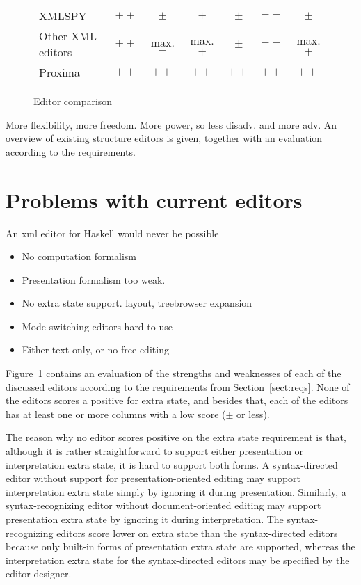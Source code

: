 \documentclass{speauth}
\begin{document}
\begin{figure}
\begin{center}
\begin{scriptsize}
\begin{tabular}[t]{l|c|c|c|c|c|c}
XMLSPY				&   $++$	&   $\pm$	&   $+$ 	&  $\pm$	&   $--$	&   $\pm$	\\
Other XML editors		&   $++$   & max. $-$ & max. $\pm$&  $\pm$&   $--$	&   max. $\pm$	\\
\hline
Proxima				&   $++$	&   $++$	&   $++$ 	&   $++$	&   $++$	&     $++$	\\
\end{tabular}                                                   
\end{scriptsize}
\caption{Editor comparison}\label{scoretable} 
\end{center}
\end{figure}



 
\bc
More flexibility, more freedom. More power, so less disadv. and more adv. An overview of existing structure editors is given, together with an evaluation according to the requirements. 

\section{Problems with current editors}
An xml editor for Haskell would never be possible
\begin{itemize}
\item No computation formalism
\item Presentation formalism too weak. 
\item No extra state support. layout, treebrowser expansion
\item Mode switching editors hard to use
\item Either text only, or no free editing
\end{itemize}
\ec

Figure~\ref{scoretable} contains an evaluation of the strengths and weaknesses of each of the discussed editors according to the requirements from Section~\ref{sect:reqs}. None of the editors scores a positive for extra state, and besides that, each of the editors has at least one or more columns with a low score ($\pm$ or less). 

The reason why no editor scores positive on the extra state requirement is that, although it is rather straightforward to support either presentation or interpretation extra state, it is hard to support both forms. A syntax-directed editor without support for presentation-oriented editing may support interpretation extra state simply by ignoring it during presentation. Similarly, a syntax-recognizing editor without document-oriented editing may support presentation extra state by ignoring it during interpretation. The syntax-recognizing editors score lower on extra state than the syntax-directed editors because only built-in forms of presentation extra state are supported, whereas the interpretation extra state for the syntax-directed editors may be specified by the editor designer.
\end{document}
